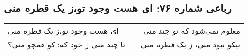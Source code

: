 \begin{center}
\section*{رباعی شماره ۷۶: ای هست وجود تو،ز یک قطره منی}
\label{sec:076}
\begin{longtable}{l p{0.5cm} r}
ای هست وجود تو،ز یک قطره منی
&&
معلوم نمی‌شود که تو چند منی
\\
تا چند منی ز خود که: کو همچو منی؟
&&
نیکو نبود منی، ز یک قطره منی
\\
\end{longtable}
\end{center}
